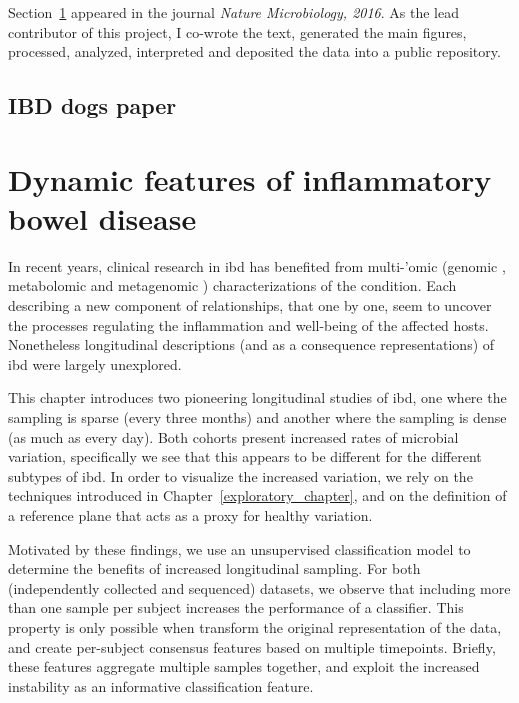 \documentclass[12pt,chapterheads]{ucsd}
\begin{document}
Section~\ref{dogs} appeared in the journal \textsl{Nature Microbiology, 2016}.  
As the lead contributor of this project, I co-wrote the text, generated the 
main figures, processed, analyzed, interpreted and deposited the data into a 
public repository.

\ifdefined\RELEASE
    
\else
    \section{IBD dogs paper}\label{dogs}
\fi

\chapter{Dynamic features of inflammatory bowel disease}\label{chapter_ibds}

In recent years, clinical research in \gls{ibd} has benefited from multi-'omic 
(genomic \cite{RN4217}, metabolomic \cite{RN4264} and metagenomic 
\cite{RN4263}) characterizations of the condition. Each describing a new 
component of relationships, that one by one, seem to uncover the processes 
regulating the inflammation and well-being of the affected hosts. Nonetheless 
longitudinal descriptions (and as a consequence representations) of \gls{ibd} 
were largely unexplored.

This chapter introduces two pioneering longitudinal studies of \gls{ibd}, one 
where the sampling is sparse (every three months) and another where the 
sampling is dense (as much as every day). Both cohorts present increased rates 
of microbial variation, specifically we see that this appears to be different 
for the different subtypes of \gls{ibd}. In order to visualize the increased 
variation, we rely on the techniques introduced in 
Chapter~\ref{exploratory_chapter}, and on the definition of a reference plane 
that acts as a proxy for healthy variation.

Motivated by these findings, we use an unsupervised classification model to 
determine the benefits of increased longitudinal sampling. For both 
(independently collected and sequenced) datasets, we observe that including 
more than one sample per subject increases the performance of a classifier.  
This property is only possible when transform the original representation of 
the data, and create per-subject consensus features based on multiple 
timepoints. Briefly, these features aggregate multiple samples together, and 
exploit the increased instability as an informative classification feature.
\end{document}
